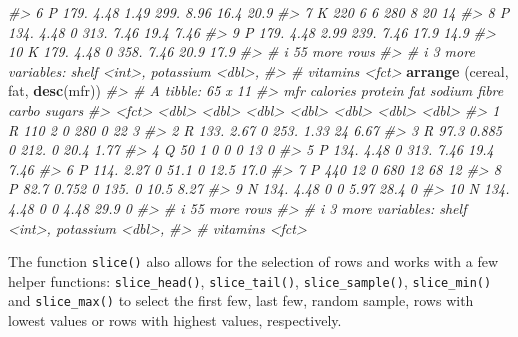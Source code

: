 \documentclass[
]{book}
\newenvironment{Shaded}{\begin{snugshade}}{\end{snugshade}}
\newcommand{\CommentTok}[1]{\textcolor[rgb]{0.56,0.35,0.01}{\textit{#1}}}
\newcommand{\FunctionTok}[1]{\textcolor[rgb]{0.13,0.29,0.53}{\textbf{#1}}}
\newcommand{\NormalTok}[1]{#1}
\begin{document}
\begin{Shaded}
\begin{Highlighting}[]
\CommentTok{\#\textgreater{}  6 P         179.    4.48  1.49   299.  8.96  16.4  20.9 }
\CommentTok{\#\textgreater{}  7 K         220     6     6      280   8     20    14   }
\CommentTok{\#\textgreater{}  8 P         134.    4.48  0      313.  7.46  19.4   7.46}
\CommentTok{\#\textgreater{}  9 P         179.    4.48  2.99   239.  7.46  17.9  14.9 }
\CommentTok{\#\textgreater{} 10 K         179.    4.48  0      358.  7.46  20.9  17.9 }
\CommentTok{\#\textgreater{} \# i 55 more rows}
\CommentTok{\#\textgreater{} \# i 3 more variables: shelf \textless{}int\textgreater{}, potassium \textless{}dbl\textgreater{},}
\CommentTok{\#\textgreater{} \#   vitamins \textless{}fct\textgreater{}}
\FunctionTok{arrange}\NormalTok{ (cereal, fat, }\FunctionTok{desc}\NormalTok{(mfr))}
\CommentTok{\#\textgreater{} \# A tibble: 65 x 11}
\CommentTok{\#\textgreater{}    mfr   calories protein   fat sodium fibre carbo sugars}
\CommentTok{\#\textgreater{}    \textless{}fct\textgreater{}    \textless{}dbl\textgreater{}   \textless{}dbl\textgreater{} \textless{}dbl\textgreater{}  \textless{}dbl\textgreater{} \textless{}dbl\textgreater{} \textless{}dbl\textgreater{}  \textless{}dbl\textgreater{}}
\CommentTok{\#\textgreater{}  1 R        110     2         0  280    0     22     3   }
\CommentTok{\#\textgreater{}  2 R        133.    2.67      0  253.   1.33  24     6.67}
\CommentTok{\#\textgreater{}  3 R         97.3   0.885     0  212.   0     20.4   1.77}
\CommentTok{\#\textgreater{}  4 Q         50     1         0    0    0     13     0   }
\CommentTok{\#\textgreater{}  5 P        134.    4.48      0  313.   7.46  19.4   7.46}
\CommentTok{\#\textgreater{}  6 P        114.    2.27      0   51.1  0     12.5  17.0 }
\CommentTok{\#\textgreater{}  7 P        440    12         0  680   12     68    12   }
\CommentTok{\#\textgreater{}  8 P         82.7   0.752     0  135.   0     10.5   8.27}
\CommentTok{\#\textgreater{}  9 N        134.    4.48      0    0    5.97  28.4   0   }
\CommentTok{\#\textgreater{} 10 N        134.    4.48      0    0    4.48  29.9   0   }
\CommentTok{\#\textgreater{} \# i 55 more rows}
\CommentTok{\#\textgreater{} \# i 3 more variables: shelf \textless{}int\textgreater{}, potassium \textless{}dbl\textgreater{},}
\CommentTok{\#\textgreater{} \#   vitamins \textless{}fct\textgreater{}}
\end{Highlighting}
\end{Shaded}

The function \texttt{slice()} also allows for the selection of rows and works with a few helper functions: \texttt{slice\_head()}, \texttt{slice\_tail()}, \texttt{slice\_sample()}, \texttt{slice\_min()} and \texttt{slice\_max()} to select the first few, last few, random sample, rows with lowest values or rows with highest values, respectively.
\end{document}
